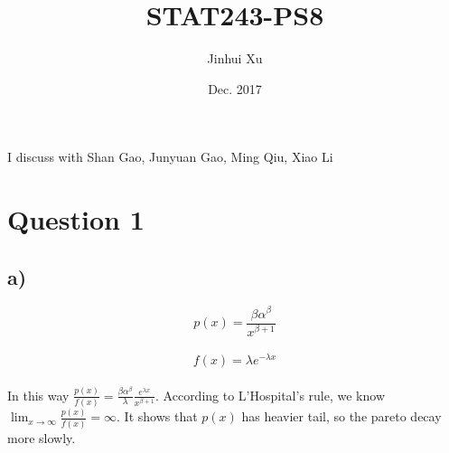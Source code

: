 \documentclass{article}\usepackage[]{graphicx}\usepackage[]{color}
\begin{document}
 
\title{STAT243-PS8}
\author{Jinhui Xu}
\date{Dec. 2017}

\maketitle

I discuss with Shan Gao, Junyuan Gao, Ming Qiu, Xiao Li 

\section{Question 1}
\subsection{a)}
$$p(x)=\frac{\beta\alpha^\beta}{x^{\beta+1}}$$\\
$$f(x)=\lambda e^{-\lambda x}$$\\

In this way $\frac{p(x)}{f(x)}=\frac{\beta\alpha^\beta}{\lambda}\frac{e^{\lambda x}}{x^{\beta+1}}$. According to L'Hospital's rule, we know $\lim_{x\to \infty}\frac{p(x)}{f(x)}=\infty$. It shows that $p(x)$ has heavier tail, so the pareto decay more slowly.
\end{document}
